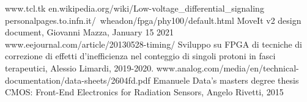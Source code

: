 \begin{thebibliography}{00}
	www.tcl.tk
	en.wikipedia.org/wiki/Low-voltage\_differential\_signaling
	personalpages.to.infn.it/~wheadon/fpga/phy100/default.html
	MoveIt v2 design document, Giovanni Mazza, January 15 2021
	www.eejournal.com/article/20130528-timing/
	Sviluppo su FPGA di tecniche di correzione di effetti d'inefficienza nel conteggio di singoli protoni in fasci terapeutici, Alessio Limardi, 2019-2020.
	www.analog.com/media/en/technical-documentation/data-sheets/2604fd.pdf
	Emanuele Data's masters degree thesis
	 CMOS: Front-End Electronics for Radiation Sensors, Angelo Rivetti, 2015
	
	
\end{thebibliography}
